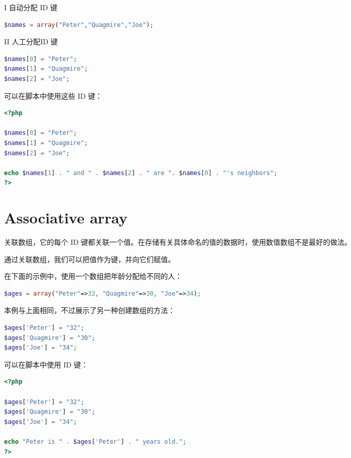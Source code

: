 \begin{compactenum}
\item[I] 自动分配 ID 键

\begin{lstlisting}[language=PHP]
$names = array("Peter","Quagmire","Joe");
\end{lstlisting}

\item[II] 人工分配ID 键

\begin{lstlisting}[language=PHP]
$names[0] = "Peter";
$names[1] = "Quagmire";
$names[2] = "Joe";
\end{lstlisting}

可以在脚本中使用这些 ID 键：


\begin{lstlisting}[language=PHP]
<?php

$names[0] = "Peter";
$names[1] = "Quagmire";
$names[2] = "Joe";

echo $names[1] . " and " . $names[2] . " are ". $names[0] . "'s neighbors";
?>
\end{lstlisting}


\end{compactenum}





\section{Associative array}


关联数组，它的每个 ID 键都关联一个值。在存储有关具体命名的值的数据时，使用数值数组不是最好的做法。

通过关联数组，我们可以把值作为键，并向它们赋值。

在下面的示例中，使用一个数组把年龄分配给不同的人：


\begin{lstlisting}[language=PHP]
$ages = array("Peter"=>32, "Quagmire"=>30, "Joe"=>34);
\end{lstlisting}

本例与上面相同，不过展示了另一种创建数组的方法：

\begin{lstlisting}[language=PHP]
$ages['Peter'] = "32";
$ages['Quagmire'] = "30";
$ages['Joe'] = "34";
\end{lstlisting}



可以在脚本中使用 ID 键：

\begin{lstlisting}[language=PHP]
<?php

$ages['Peter'] = "32";
$ages['Quagmire'] = "30";
$ages['Joe'] = "34";

echo "Peter is " . $ages['Peter'] . " years old.";
?>
\end{lstlisting}

